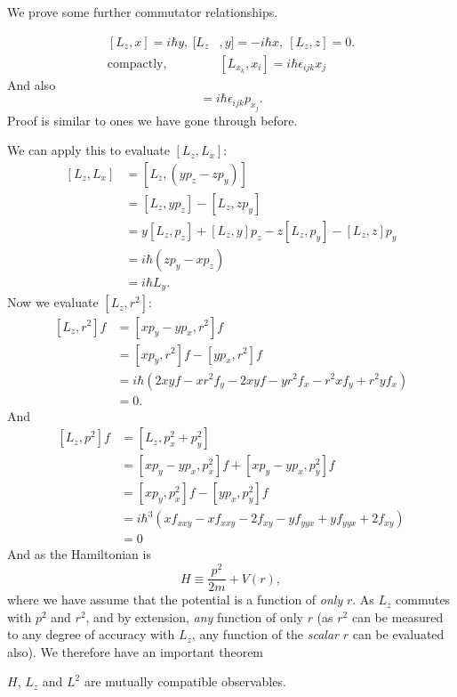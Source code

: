 We prove some further commutator relationships. 
\begin{prt}
\begin{equation}
\begin{aligned}
[L_z,x]=i\hbar y,\ [L_z&,y]=-i\hbar x,\ [L_z,z]=0. \\
\text{compactly, }&[L_{x_k},x_i]=i\hbar\epsilon_{ijk} x_j
\end{aligned}
\end{equation}
And also
\begin{equation}
[L_{x_k},p_{x_i}]=i\hbar\epsilon_{ijk} p_{x_j}.
\end{equation}
Proof is similar to ones we have gone through before. 
\end{prt}
We can apply this to evaluate $[L_z,L_x]$:
\begin{equation}
\begin{aligned}
[L_z,L_x]&=[L_z,(yp_z-zp_y)]\\
&=[L_z,yp_z]-[L_z,zp_y]\\
&=y[L_z,p_z]+[L_z,y]p_z-z[L_z,p_y]-[L_z,z]p_y\\
&=i\hbar(zp_y-xp_z)\\
&=i\hbar L_y. 
\end{aligned}
\end{equation}
Now we evaluate $[L_z,r^2]$:
\begin{equation}
\begin{aligned}
[L_z,r^2]f&=[xp_y-yp_x,r^2]f\\
&=[xp_y,r^2]f-[yp_x,r^2]f\\
&=i\hbar(2xyf-xr^2f_y-2xyf-yr^2f_x-r^2xf_y+r^2yf_x)\\
&=0. 
\end{aligned}
\end{equation}
And 
\begin{equation}
\begin{aligned}
[L_z,p^2]f&=[L_z,p_x^2+p_y^2]\\
&=[xp_y-yp_x,p_x^2]f+[xp_y-yp_x,p_y^2]f\\
&=[xp_y,p_x^2]f-[yp_x,p_y^2]f\\
&=i\hbar^3(xf_{xxy}-xf_{xxy}-2f_{xy}-yf_{yyx}+yf_{yyx}+2f_{xy})\\
&=0
\end{aligned}
\end{equation}
And as the Hamiltonian is 
\begin{equation}
H\equiv\frac{p^2}{2m}+V(r), 
\end{equation}
where we have assume that the potential is a function of \textit{only} $r$. 
As $L_z$ commutes with $p^2$ and $r^2$, and by extension, \textit{any} function of 
only $r$ (as $r^2$ can be measured to any degree of accuracy with $L_z$, 
any function of the \textit{scalar} $r$ can be evaluated also). 
We therefore have an important theorem
\begin{thrm}
$H$, $L_z$ and $L^2$ are mutually compatible observables. 
\end{thrm}
